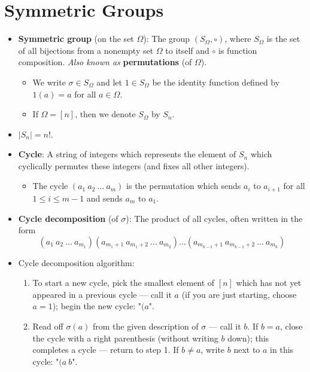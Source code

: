 \documentclass[../notes.tex]{subfiles}
\begin{document}
\section{Symmetric Groups}
\begin{itemize}
    \item \textbf{Symmetric group} (on the set $\Omega$): The group $(S_\Omega,\circ)$, where $S_\Omega$ is the set of all bijections from a nonempty set $\Omega$ to itself and $\circ$ is function composition. \emph{Also known as} \textbf{permutations} (of $\Omega$).
    \begin{itemize}
        \item We write $\sigma\in S_\Omega$ and let $1\in S_\Omega$ be the identity function defined by $1(a)=a$ for all $a\in\Omega$.
        \item If $\Omega=[n]$, then we denote $S_\Omega$ by $S_n$.
    \end{itemize}
    \item $|S_n|=n!$.
    \item \textbf{Cycle}: A string of integers which represents the element of $S_n$ which cyclically permutes these integers (and fixes all other integers).
    \begin{itemize}
        \item The cycle $(a_1\ a_2\ \dots\ a_m)$ is the permutation which sends $a_i$ to $a_{i+1}$ for all $1\leq i\leq m-1$ and sends $a_m$ to $a_1$.
    \end{itemize}
    \item \textbf{Cycle decomposition} (of $\sigma$): The product of all cycles, often written in the form
    \begin{equation*}
        (a_1\ a_2\ \dots\ a_{m_1})(a_{m_1+1}\ a_{m_1+2}\ \dots\ a_{m_2})\dots(a_{m_{k-1}+1}\ a_{m_{k-1}+2}\ \dots\ a_{m_k})
    \end{equation*}
    \item Cycle decomposition algorithm:
    \begin{enumerate}
        \item To start a new cycle, pick the smallest element of $[n]$ which has not yet appeared in a previous cycle --- call it $a$ (if you are just starting, choose $a=1$); begin the new cycle: "$(a$".
        \item Read off $\sigma(a)$ from the given description of $\sigma$ --- call it $b$. If $b=a$, close the cycle with a right parenthesis (without writing $b$ down); this completes a cycle --- return to step 1. If $b\neq a$, write $b$ next to $a$ in this cycle: "$(a\ b$".

\end{enumerate}
\end{itemize}
\end{document}

